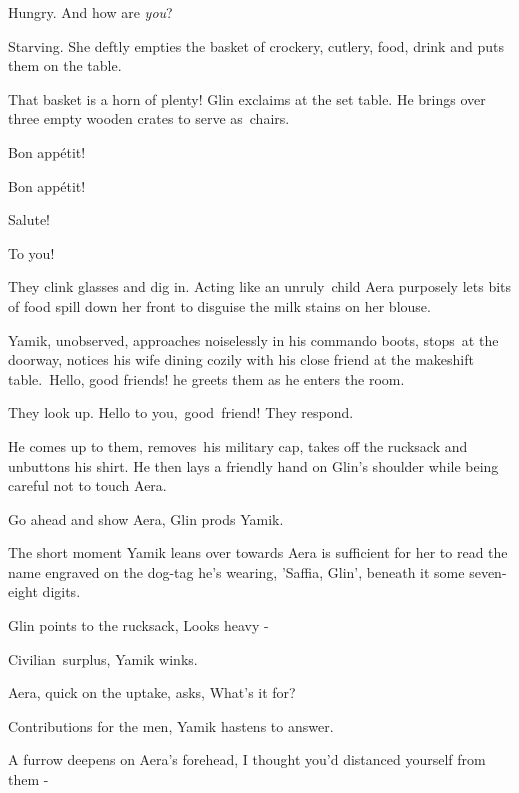 \documentclass[twoside,11pt]{book}
\begin{document}
{\textquotedbl}Hungry. And how are \textit{you}?{\textquotedbl} 

{\textquotedbl}Starving.{\textquotedbl} She deftly empties the basket of crockery, cutlery, food, drink and puts them on
the table. 

{\textquotedbl}That basket is a horn of plenty!{\textquotedbl} Glin exclaims at the set table. He brings over three
empty wooden crates to serve as\ chairs.\ 

{\textquotedbl}Bon app\'etit!{\textquotedbl} 

{\textquotedbl}Bon app\'etit!{\textquotedbl} 

{\textquotedbl}Salute!{\textquotedbl} 

{\textquotedbl}To you!{\textquotedbl} 

They clink glasses and dig in. Acting like an unruly\ child Aera purposely lets bits of food spill down her front to
disguise the milk stains on her blouse.\ 

Yamik, unobserved, approaches noiselessly in his commando boots, stops~at the doorway, notices his wife dining cozily
with his close friend at the makeshift table.\ {\textquotedbl}Hello, good friends!{\textquotedbl} he greets them as he
enters the room. ~

They look up. {\textquotedbl}Hello to you,{\ }good{\ }friend!{\textquotedbl} They respond.

He comes up to them, removes{\ }his military cap, takes off the rucksack and
unbuttons his shirt. He then lays a friendly hand on Glin's shoulder while being careful not to touch Aera.

{\textquotedbl}Go ahead and show Aera,{\textquotedbl} Glin prods Yamik.

The short moment Yamik leans over towards Aera is sufficient for her to read the name engraved on the
dog{{}-}tag he's wearing, 'Saffia, Glin', beneath it some seven-eight digits. 

Glin points to the rucksack, {\textquotedbl}Looks heavy -{\textquotedbl}~ 

{\textquotedbl}Civilian~surplus,{\textquotedbl} Yamik winks. 

Aera, quick on the uptake, asks, {\textquotedbl}What's it for?{\textquotedbl} 

{\textquotedbl}Contributions for the men,{\textquotedbl} Yamik hastens to answer. 

A furrow deepens on Aera's forehead, {\textquotedbl}I thought you'd distanced yourself from them -{\textquotedbl} 
\end{document}
